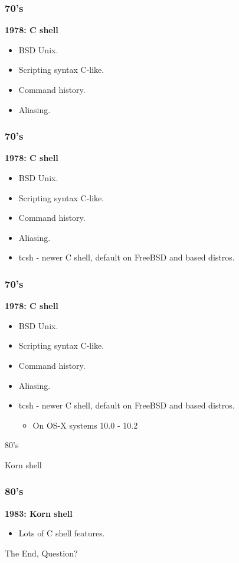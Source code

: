 \documentclass[aspectratio=169]{beamer}
\begin{document}
\begin{frame}
	\frametitle{ 70's}
	\textbf{1978: C shell}
	\begin{itemize}
		\item BSD Unix.
		\item Scripting syntax C-like. 
		\item Command history.
		\item Aliasing.
	\end{itemize}
\end{frame}

\begin{frame}
	\frametitle{ 70's}
	\textbf{1978: C shell}
	\begin{itemize}
		\item BSD Unix.
		\item Scripting syntax C-like. 
		\item Command history.
		\item Aliasing.
		\item tcsh - newer C shell, default on FreeBSD and based distros.
	\end{itemize}
\end{frame}

\begin{frame}
	\frametitle{ 70's}
	\textbf{1978: C shell}
	\begin{itemize}
		\item BSD Unix.
		\item Scripting syntax C-like. 
		\item Command history.
		\item Aliasing.
		\item tcsh - newer C shell, default on FreeBSD and based distros.
		\begin{itemize}
			\item On OS-X systems 10.0 - 10.2
		\end{itemize}
	\end{itemize}
\end{frame}


\begin{frame}
    \Huge{\centerline{80's}}
\end{frame}

\begin{frame}
    \Huge{\centerline{Korn shell}}
\end{frame}

\begin{frame}
	\frametitle{ 80's}
	\textbf{1983: Korn shell}
	\begin{itemize}
		\item Lots of C shell features.
	\end{itemize}
\end{frame}




\begin{frame}
    \Huge{\centerline{The End, Question?}}
\end{frame}

\end{document}
